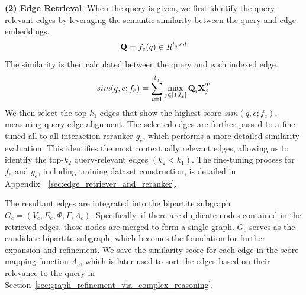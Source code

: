 \textbf{(2) Edge Retrieval}: 
When the query is given, we first identify the query-relevant edges by leveraging the semantic similarity between the query and edge embeddings.
\vspace{-2mm}
\begin{equation}
    \textbf{Q} = f_{e}(q) \in R^{l_q \times d}
    \vspace{-2mm}
\end{equation}
The similarity is then calculated between the query and each indexed edge.
\vspace{-2mm}
\begin{equation}
     sim(q, e;f_{e}) = \sum_{i=1}^{l_q} \max_{j\in [1, l_x]} \textbf{Q}_i\textbf{X}_j^T
     \vspace{-2mm}
\label{eqn:similarity_query_edge}
\end{equation}
We then select the top-$k_1$ edges that show the highest score $sim(q, e;f_{e})$, measuring query-edge alignment.
The selected edges are further passed to a fine-tuned all-to-all interaction reranker $g_{e}$, which performs a more detailed similarity evaluation.
This identifies the most contextually relevant edges, allowing us to identify the top-$k_2$ query-relevant edges $(k_2 < k_1)$.
The fine-tuning process for $f_e$ and $g_e$, including training dataset construction, is detailed in Appendix~\textsection~\ref{sec:edge_retriever_and_reranker}.


The resultant edges are integrated into the bipartite subgraph $G_c = (V_c, E_c, \Phi, \Gamma, \Lambda_c)$. 
Specifically, if there are duplicate nodes contained in the retrieved edges, those nodes are merged to form a single graph.
$G_c$ serves as the candidate bipartite subgraph, which becomes the foundation for further expansion and refinement.
We save the similarity score for each edge in the score mapping function $\Lambda_c$, which is later used to sort the edges based on their relevance to the query in Section~\ref{sec:graph_refinement_via_complex_reasoning}.

